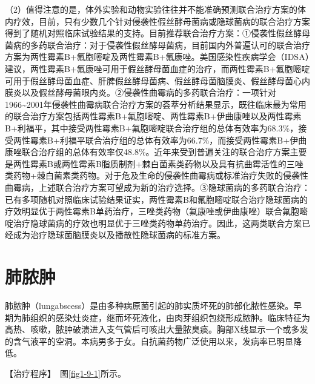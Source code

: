 （2）值得注意的是，体外实验和动物实验往往并不能准确预测联合治疗方案的体内疗效，目前，只有少数几个针对侵袭性假丝酵母菌病或隐球菌病的联合治疗方案得到了随机对照临床试验结果的支持。目前推荐联合治疗方案：①侵袭性假丝酵母菌病的多药联合治疗：对于侵袭性假丝酵母菌病，目前国内外普遍认可的联合治疗方案为两性霉素B+氟胞嘧啶及两性霉素B+氟康唑。美国感染性疾病学会（IDSA）建议，两性霉素B+氟康唑可用于假丝酵母菌血症的治疗，而两性霉素B+氟胞嘧啶可用于假丝酵母菌血症、肝脾假丝酵母菌病、假丝酵母菌脑膜炎、假丝酵母菌心内膜炎以及假丝酵母菌眼内炎。②侵袭性曲霉病的多药联合治疗：一项针对1966\textasciitilde{}2001年侵袭性曲霉病联合治疗方案的荟萃分析结果显示，既往临床最为常用的联合治疗方案包括两性霉素B+氟胞嘧啶、两性霉素B+伊曲康唑以及两性霉素B+利福平，其中接受两性霉素B+氟胞嘧啶联合治疗组的总体有效率为68.3\%，接受两性霉素B+利福平联合治疗组的总体有效率为66.7\%，而接受两性霉素B+伊曲康唑联合治疗组的总体有效率仅48.8\%。近年来受到普遍关注的联合治疗方案主要是两性霉素B或两性霉素B脂质制剂+棘白菌素类药物以及具有抗曲霉活性的三唑类药物+棘白菌素类药物。对于危及生命的侵袭性曲霉病或标准治疗失败的侵袭性曲霉病，上述联合治疗方案可望成为新的治疗选择。③隐球菌病的多药联合治疗：已有多项随机对照临床试验结果证实，两性霉素B和氟胞嘧啶联合治疗隐球菌病的疗效明显优于两性霉素B单药治疗，三唑类药物（氟康唑或伊曲康唑）联合氟胞嘧啶治疗隐球菌病的疗效也明显优于三唑类药物单药治疗。因此，这两类联合方案已经成为治疗隐球菌脑膜炎以及播散性隐球菌病的标准方案。

\section{肺脓肿}

肺脓肿（lungabscess）是由多种病原菌引起的肺实质坏死的肺部化脓性感染。早期为肺组织的感染灶炎症，继而坏死液化，由肉芽组织包绕形成脓肿。临床特征为高热、咳嗽，脓肿破溃进入支气管后可咳出大量脓臭痰。胸部X线显示一个或多发的含气液平的空洞。本病男多于女。自抗菌药物广泛使用以来，发病率已明显降低。

【治疗程序】　图\ref{fig1-9-1}所示。

